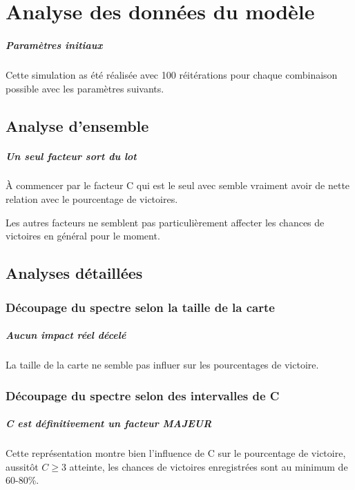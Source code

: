\chapter{Analyse des données du modèle}

\paragraph{Paramètres initiaux}
Cette simulation as été réalisée avec 100 réitérations pour chaque combinaison possible avec les paramètres suivants.


\section{Analyse d'ensemble}


\paragraph{Un seul facteur sort du lot}
À commencer par le facteur C qui est le seul avec semble vraiment avoir de nette relation avec le pourcentage de victoires.

Les autres facteurs ne semblent pas particulièrement affecter les chances de victoires en général pour le moment.


\section{Analyses détaillées}


\subsection{Découpage du spectre selon la taille de la carte}
\paragraph{Aucun impact réel décelé}
La taille de la carte ne semble pas influer sur les pourcentages de victoire.




\subsection{Découpage du spectre selon des intervalles de C}
\paragraph{C est définitivement un facteur MAJEUR}
Cette représentation montre bien l'influence de C sur le pourcentage de victoire, aussitôt $C \ge 3$ atteinte, les chances de victoires enregistrées sont au minimum de 60-80\%.

